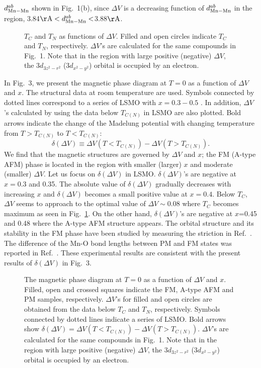 $d_{\rm Mn-Mn}^{ab}$ shown in Fig.~1(b),
since $\Delta V$ is a decreasing function of $d_{\rm Mn-Mn}^{ab}$ in the
region, 3.84${\rm \AA} < d^{ab}_{\rm Mn-Mn} <$3.88$\rm \AA$.
\begin{figure}
\columnwidth
\centerline{}
\caption{$T_C$ and $T_N$ as functions of  $\Delta V$.  Filled and open circles indicate $T_C$ and $T_N$, respectively. $\Delta V$'s are calculated for the same compounds in Fig.~1.  Note that in the region with large positive (negative) $\Delta V$,  the $3d_{3z^2-r^2}$ ($3d_{x^2-y^2}$) orbital is occupied by an electron.}
\label{fig:fig2}
\end{figure}
\par
In Fig.~3, we present the magnetic phase diagram at $T=0$ as a function of
$\Delta V$ and $x$.
The structural data at room temperature are used.
Symbols connected by dotted lines correspond to a series of
LSMO with $x=0.3-0.5$ \cite{kubota}.
In addition, $\Delta V$'s calculated by using the data below $T_{C(N)}$ in LSMO are also plotted.
Bold arrows indicate the change of the Madelung potential
with changing temperature from $T>T_{C(N)}$ to $T<T_{C(N)}$:
\begin{equation}
\delta (\Delta V) \equiv \Delta V(T<T_{C(N)})-\Delta V(T>T_{C(N)}) .
\label{eq:deltv}
\end{equation}
We find that
the magnetic structures are governed by $\Delta V$ and $x$;
the FM (A-type AFM) phase is located in the region with
smaller (larger) $x$ and moderate (smaller) $\Delta V$.
Let us focus on $\delta (\Delta V)$ in LSMO.
$\delta (\Delta V)$'s are negative at $x=0.3$ and 0.35.
The absolute value of $\delta (\Delta V)$
gradually decreases with increasing $x$ and
$\delta (\Delta V)$ becomes a small positive value at $x=0.4$.
Below $T_C$, $\Delta V$ seems to approach to the optimal value of $\Delta V \sim 0.08$ where
$T_C$ becomes maximum as seen in Fig.~\ref{fig:fig2}.
On the other hand,
$\delta (\Delta V)$'s are negative at $x$=0.45 and 0.48 where
the A-type AFM structure appears.
The orbital structure and its stability in the FM phase have been studied by
measuring the striction in Ref.~.
The difference of the Mn-O bond lengths between PM and FM
states was reported in Ref.~.
These experimental results are consistent with the present results of $\delta (\Delta V)$ in Fig.~3.
\begin{figure}
\columnwidth
\centerline{}
\caption{The magnetic phase diagram at $T=0$ as a function of $\Delta V$ and $x$. Filled, open and crossed squares indicate the FM, A-type AFM and  PM samples, respectively.  $\Delta V$'s for filled and open circles are obtained  from the data below $T_{C}$ and $T_N$, respectively. Symbols connected by dotted lines indicate a series of LSMO.  Bold arrows show $\delta (\Delta V)=\Delta V(T<T_{C(N)})-\Delta V(T>T_{C(N)})$.  $\Delta V$'s are calculated for the same compounds in Fig.~1. Note that in the region with large positive (negative) $\Delta V$,  the $3d_{3z^2-r^2}$ ($3d_{x^2-y^2}$) orbital is occupied by an electron.}
\label{fig:fig3}
\end{figure}
